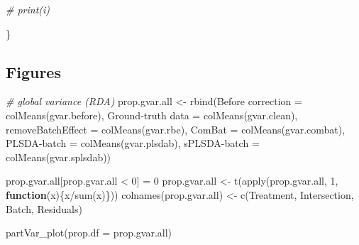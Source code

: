 \documentclass[
]{book}
\newenvironment{Shaded}{\begin{snugshade}}{\end{snugshade}}
\newcommand{\AttributeTok}[1]{\textcolor[rgb]{0.77,0.63,0.00}{#1}}
\newcommand{\CommentTok}[1]{\textcolor[rgb]{0.56,0.35,0.01}{\textit{#1}}}
\newcommand{\ControlFlowTok}[1]{\textcolor[rgb]{0.13,0.29,0.53}{\textbf{#1}}}
\newcommand{\DecValTok}[1]{\textcolor[rgb]{0.00,0.00,0.81}{#1}}
\newcommand{\FunctionTok}[1]{\textcolor[rgb]{0.00,0.00,0.00}{#1}}
\newcommand{\NormalTok}[1]{#1}
\newcommand{\OtherTok}[1]{\textcolor[rgb]{0.56,0.35,0.01}{#1}}
\newcommand{\SpecialCharTok}[1]{\textcolor[rgb]{0.00,0.00,0.00}{#1}}
\newcommand{\StringTok}[1]{\textcolor[rgb]{0.31,0.60,0.02}{#1}}
\begin{document}
\begin{Shaded}
\begin{Highlighting}[]
  \CommentTok{\# print(i)}
  
\NormalTok{\}}
\end{Highlighting}
\end{Shaded}

\hypertarget{figures-4}{%
\subsection{Figures}\label{figures-4}}

\begin{Shaded}
\begin{Highlighting}[]
\CommentTok{\# global variance (RDA)}
\NormalTok{prop.gvar.all }\OtherTok{\textless{}{-}} \FunctionTok{rbind}\NormalTok{(}\StringTok{\textasciigrave{}}\AttributeTok{Before correction}\StringTok{\textasciigrave{}} \OtherTok{=} \FunctionTok{colMeans}\NormalTok{(gvar.before),}
                       \StringTok{\textasciigrave{}}\AttributeTok{Ground{-}truth data}\StringTok{\textasciigrave{}} \OtherTok{=} \FunctionTok{colMeans}\NormalTok{(gvar.clean),}
                       \AttributeTok{removeBatchEffect =} \FunctionTok{colMeans}\NormalTok{(gvar.rbe),}
                       \AttributeTok{ComBat =} \FunctionTok{colMeans}\NormalTok{(gvar.combat),}
                       \StringTok{\textasciigrave{}}\AttributeTok{PLSDA{-}batch}\StringTok{\textasciigrave{}} \OtherTok{=} \FunctionTok{colMeans}\NormalTok{(gvar.plsdab),}
                       \StringTok{\textasciigrave{}}\AttributeTok{sPLSDA{-}batch}\StringTok{\textasciigrave{}} \OtherTok{=} \FunctionTok{colMeans}\NormalTok{(gvar.splsdab))}

\NormalTok{prop.gvar.all[prop.gvar.all }\SpecialCharTok{\textless{}} \DecValTok{0}\NormalTok{] }\OtherTok{=} \DecValTok{0}
\NormalTok{prop.gvar.all }\OtherTok{\textless{}{-}} \FunctionTok{t}\NormalTok{(}\FunctionTok{apply}\NormalTok{(prop.gvar.all, }\DecValTok{1}\NormalTok{, }\ControlFlowTok{function}\NormalTok{(x)\{x}\SpecialCharTok{/}\FunctionTok{sum}\NormalTok{(x)\}))}
\FunctionTok{colnames}\NormalTok{(prop.gvar.all) }\OtherTok{\textless{}{-}} \FunctionTok{c}\NormalTok{(}\StringTok{\textquotesingle{}Treatment\textquotesingle{}}\NormalTok{, }\StringTok{\textquotesingle{}Intersection\textquotesingle{}}\NormalTok{, }\StringTok{\textquotesingle{}Batch\textquotesingle{}}\NormalTok{, }\StringTok{\textquotesingle{}Residuals\textquotesingle{}}\NormalTok{)}

\FunctionTok{partVar\_plot}\NormalTok{(}\AttributeTok{prop.df =}\NormalTok{ prop.gvar.all)}
\end{Highlighting}
\end{Shaded}
\end{document}
